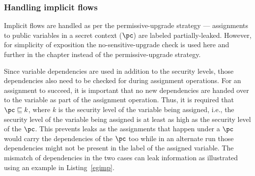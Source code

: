 \subsubsection{Handling implicit flows}
Implicit flows are handled as per the permissive-upgrade strategy ---
assignments to public variables in a secret context ($\pc$) are
labeled partially-leaked. However, for simplicity of exposition the
no-sensitive-upgrade check is used here and further in the chapter
instead of the permissive-upgrade strategy. 

Since variable dependencies are used in
addition to the security levels, those dependencies also need to be
checked for during assignment operations. For an assignment to
succeed, it is important that
no new dependencies are handed over to the variable as part of the
assignment operation. Thus, it is required that %
  $\pc \sqsubseteq k$, where $k$ is the security level of the
  variable being assigned, i.e., the security
  level of the variable being assigned is at least as high as the
  security level of the $\pc$. 
  This prevents leaks as the assignments
  that happen under a $\pc$ would carry the dependencies of the $\pc$
  too while in an alternate run those dependencies might not be
  present in the label of the assigned variable. 
The mismatch of dependencies in the two cases can leak information as
illustrated using an example in Listing~\ref{egimp}. 



